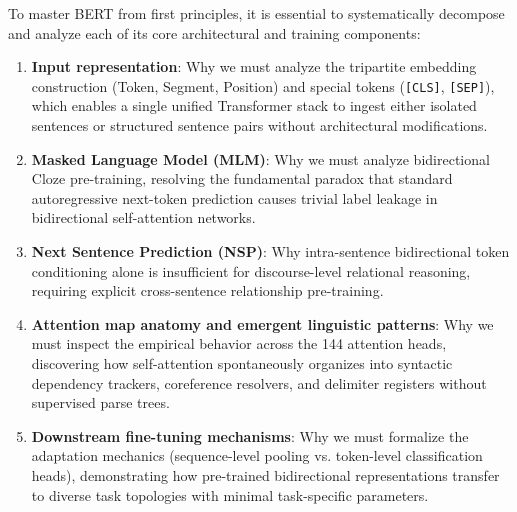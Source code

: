 \documentclass[../../main.tex]{subfiles}
\begin{document}
To master BERT from first principles, it is essential to systematically decompose and analyze each of its core architectural and training components:
\begin{enumerate}
    \item \textbf{Input representation}: Why we must analyze the tripartite embedding construction (Token, Segment, Position) and special tokens (\texttt{[CLS]}, \texttt{[SEP]}), which enables a single unified Transformer stack to ingest either isolated sentences or structured sentence pairs without architectural modifications.
    \item \textbf{Masked Language Model (MLM)}: Why we must analyze bidirectional Cloze pre-training, resolving the fundamental paradox that standard autoregressive next-token prediction causes trivial label leakage in bidirectional self-attention networks.
    \item \textbf{Next Sentence Prediction (NSP)}: Why intra-sentence bidirectional token conditioning alone is insufficient for discourse-level relational reasoning, requiring explicit cross-sentence relationship pre-training.
    \item \textbf{Attention map anatomy and emergent linguistic patterns}: Why we must inspect the empirical behavior across the 144 attention heads, discovering how self-attention spontaneously organizes into syntactic dependency trackers, coreference resolvers, and delimiter registers without supervised parse trees.
    \item \textbf{Downstream fine-tuning mechanisms}: Why we must formalize the adaptation mechanics (sequence-level pooling vs. token-level classification heads), demonstrating how pre-trained bidirectional representations transfer to diverse task topologies with minimal task-specific parameters.
\end{enumerate}
\end{document}
